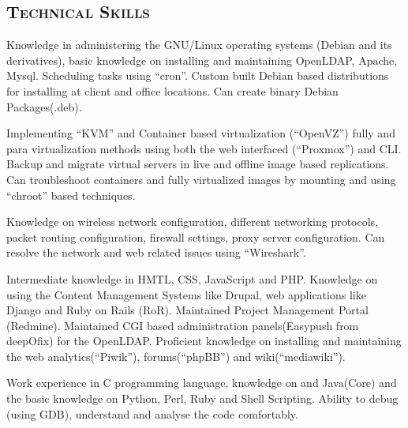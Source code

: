 \begin{resume}
\section{\textsc{Technical Skills}}

\dates{}
\begin{position}
Knowledge in administering the GNU/Linux operating systems (Debian and
its derivatives), basic knowledge on installing and maintaining
OpenLDAP, Apache, Mysql. Scheduling tasks using ``cron''. Custom built
Debian based distributions for installing at client and office
locations. Can create binary Debian Packages(.deb). 
\end{position}

\dates{}
\begin{position}
Implementing ``KVM'' and Container based virtualization (``OpenVZ'')
fully and para virtualization methods using both the web interfaced
(``Proxmox'') and CLI. Backup and migrate virtual servers in live and
offline image based replications. Can troubleshoot containers and
fully virtualized images by mounting and using ``chroot'' based
techniques.
\end{position}

\dates{}
\begin{position}
Knowledge on wireless network configuration, different networking
protocols, packet routing configuration, firewall settings, proxy
server configuration. Can resolve the network and web related issues
using ``Wireshark''.
\end{position}
 
\dates{}
\begin{position}
Intermediate knowledge in HMTL, CSS, JavaScript and PHP. Knowledge on
using the Content Management Systems like Drupal, web applications
like Django and Ruby on Rails (RoR). Maintained Project Management
Portal (Redmine). Maintained CGI based administration panels(Easypush
from deepOfix) for the OpenLDAP. Proficient knowledge on installing
and maintaining the web analytics(``Piwik''), forums(``phpBB'') and
wiki(``mediawiki''). 

\end{position}

\dates{}
\begin{position}
Work experience in C programming language, knowledge on \Cplusplus and
Java(Core) and the basic knowledge on Python, Perl, Ruby and Shell
Scripting. Ability to debug (using GDB), understand and analyse the
code comfortably.
\end{position}


\end{resume}
